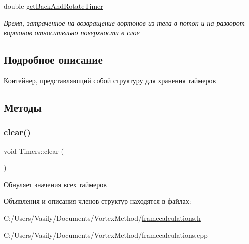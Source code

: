 \begin{DoxyCompactItemize}
\mbox{\label{struct_timers_a69059d6a877837dd7079e86232ec4085}} 
double \mbox{\hyperlink{struct_timers_a69059d6a877837dd7079e86232ec4085}{get\+Back\+And\+Rotate\+Timer}}
\begin{DoxyCompactList}\small\item\em Время, затраченное на возвращение вортонов из тела в поток и на разворот вортонов относительно поверхности в слое \end{DoxyCompactList}\end{DoxyCompactItemize}


\subsection{Подробное описание}
Контейнер, представляющий собой структуру для хранения таймеров 

\subsection{Методы}
\mbox{\label{struct_timers_afc4db9e23485b679e2f069f2860a4326}} 
\subsubsection{\texorpdfstring{clear()}{clear()}}
{\footnotesize\ttfamily void Timers\+::clear (\begin{DoxyParamCaption}{ }\end{DoxyParamCaption})}

Обнуляет значения всех таймеров 

Объявления и описания членов структур находятся в файлах\+:\begin{DoxyCompactItemize}
\item 
C\+:/\+Users/\+Vasily/\+Documents/\+Vortex\+Method/\mbox{\hyperlink{framecalculations_8h}{framecalculations.\+h}}\item 
C\+:/\+Users/\+Vasily/\+Documents/\+Vortex\+Method/framecalculations.\+cpp\end{DoxyCompactItemize}
